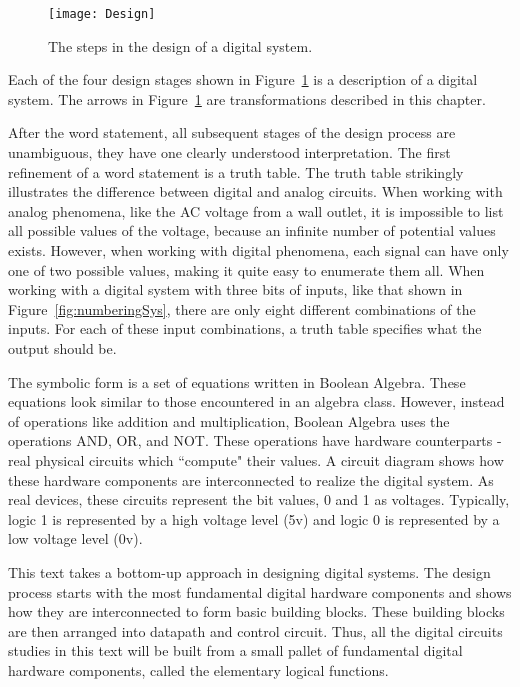 \begin{figure}[ht]
\texttt{[image: Design]}
\caption{The steps in the design of a digital system.}
\label{fig:representationsDesign}
\end{figure}

Each of the four design stages shown in Figure~\ref{fig:representationsDesign} 
is a description of a digital system.  The arrows in 
Figure~\ref{fig:representationsDesign} are 
transformations described in this chapter.  

After the word statement, all subsequent stages of the design process
are unambiguous, they have one clearly understood interpretation.  The first
refinement of a word statement is a truth table.  The truth table strikingly 
illustrates the difference between digital and analog circuits.  When
working with analog phenomena, like the AC voltage from a wall outlet,
it is impossible to list all possible values of the voltage, because 
an infinite number of potential values exists.  However, when working
with digital phenomena, each signal can have only one of two possible values,
making it quite easy to enumerate them all.  When working with a
digital system with three bits of inputs, like that shown in 
Figure~\ref{fig:numberingSys}, there are only eight
different combinations of the inputs.  For each of these input 
combinations, a truth table specifies what the output should be.  

The symbolic form is a set of equations written in Boolean Algebra.
These equations look similar to those encountered
in an algebra class. However, instead of operations like addition 
and multiplication, Boolean Algebra uses the operations AND, OR, and 
NOT.  These operations have hardware counterparts - real physical 
circuits which ``compute" their values.  A circuit diagram shows how
these hardware components are interconnected to realize the 
digital system.  As real devices, these circuits represent the bit 
values, 0 and 1 as voltages.  Typically, logic 1 is represented by 
a high voltage level (5v) and logic 0 is represented by a low 
voltage level (0v). 

This text takes a bottom-up approach in designing digital systems.  
The design process starts with the most fundamental digital hardware 
components and shows how they are interconnected to form basic building 
blocks.  These building blocks are then arranged into datapath and 
control circuit.  Thus, all the digital circuits studies in this text
will be built from a small pallet of fundamental digital hardware 
components, called the elementary logical functions.

